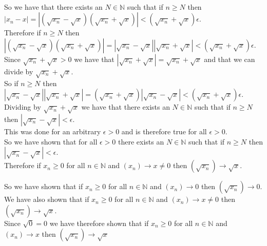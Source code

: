 \documentclass{article}
\begin{document}
\begin{center}
\begin{itemize}
        \\So we have that there exists an $N\in\mathbb{N}$ such that if $n\geq N$ then $|x_n - x| = |(\sqrt{x_n} -\sqrt{x})(\sqrt{x_n} +\sqrt{x})| < (\sqrt{x_n} +\sqrt{x})\epsilon$.
        \\Therefore if $n\geq N$ then $|(\sqrt{x_n} -\sqrt{x})(\sqrt{x_n} +\sqrt{x})| = |\sqrt{x_n} -\sqrt{x}||\sqrt{x_n} +\sqrt{x}| < (\sqrt{x_n} +\sqrt{x})\epsilon$.
        \\Since $\sqrt{x_n} +\sqrt{x} > 0$ we have that $|\sqrt{x_n} +\sqrt{x}| = \sqrt{x_n} +\sqrt{x}$ and that we can divide by $\sqrt{x_n} +\sqrt{x}$.
        \\So if $n\geq N$ then $|\sqrt{x_n} -\sqrt{x}||\sqrt{x_n} +\sqrt{x}| = (\sqrt{x_n} +\sqrt{x})|\sqrt{x_n} -\sqrt{x}| < (\sqrt{x_n} +\sqrt{x})\epsilon$.
        \\Dividing by $\sqrt{x_n} +\sqrt{x}$ we have that there exists an $N\in\mathbb{N}$ such that if $n\geq N$ then $|\sqrt{x_n} -\sqrt{x}| <\epsilon$.
        \\This was done for an arbitrary $\epsilon > 0$ and is therefore true for all $\epsilon > 0$.
        \\So we have shown that for all $\epsilon > 0$ there exists an $N\in\mathbb{N}$ such that if $n\geq N$ then $|\sqrt{x_n} -\sqrt{x}| <\epsilon$.
        \\Therefore if $x_n\geq 0$ for all $n\in\mathbb{N}$ and $(x_n)\rightarrow x\neq 0$ then $(\sqrt{x_n})\rightarrow\sqrt{x}$.
    \end{itemize}
    So we have shown that if $x_n\geq 0$ for all $n\in\mathbb{N}$ and $(x_n)\rightarrow 0$ then $(\sqrt{x_n})\rightarrow 0$.
    \\We have also shown that if $x_n\geq 0$ for all $n\in\mathbb{N}$ and $(x_n)\rightarrow x\neq 0$ then $(\sqrt{x_n})\rightarrow\sqrt{x}$.
    \\Since $\sqrt{0} = 0$ we have therefore shown that if $x_n\geq 0$ for all $n\in\mathbb{N}$ and $(x_n)\rightarrow x$ then $(\sqrt{x_n})\rightarrow\sqrt{x}$ \qedsymbol
\end{center}


\newpage
\end{document}
